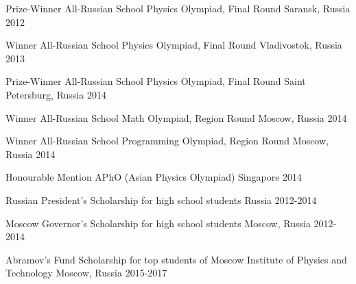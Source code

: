 


\begin{cvhonors}

\cvhonor
{Prize-Winner} %
{All-Russian School Physics Olympiad, Final Round} %
{Saransk, Russia} %
{2012} %

\cvhonor
{Winner} %
{All-Russian School Physics Olympiad, Final Round} %
{Vladivostok, Russia} %
{2013} %

\cvhonor
{Prize-Winner} %
{All-Russian School Physics Olympiad, Final Round} %
{Saint Petersburg, Russia} %
{2014} %

\cvhonor
{Winner} %
{All-Russian School Math Olympiad, Region Round} %
{Moscow, Russia} %
{2014} %

\cvhonor
{Winner} %
{All-Russian School Programming Olympiad, Region Round} %
{Moscow, Russia} %
{2014} %

\cvhonor
{Honourable Mention} %
{APhO (Asian Physics Olympiad)} %
{Singapore} %
{2014} %

\cvhonor
{Russian President's Scholarship}
{for high school students}
{Russia}
{2012-2014}

\cvhonor
{Moscow Governor’s Scholarship}
{for high school students}
{Moscow, Russia}
{2012-2014}

\cvhonor
{Abramov’s Fund Scholarship}
{for top students of Moscow Institute of Physics and Technology}
{Moscow, Russia}
{2015-2017}



\end{cvhonors}
